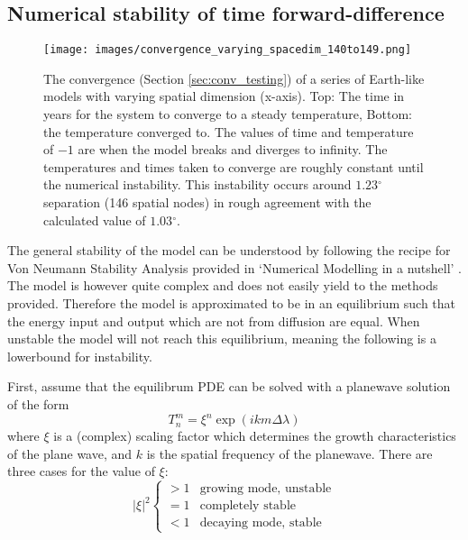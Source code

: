 \documentclass[12pt, onecolumn]{revtex4-2}    %
\newcommand{\degrees}{\ensuremath{^{\circ}}}
\begin{document}
\clearpage

\appendix


\subsection{Numerical stability of time forward-difference} \label{sec:numerical_stability}

\begin{figure}[ht]
    \texttt{[image: images/convergence\_varying\_spacedim\_140to149.png]}
    \caption{The convergence (Section \ref{sec:conv_testing}) of a series of Earth-like models with varying spatial dimension (x-axis). Top: The time in years for the system to converge to a steady temperature, Bottom: the temperature converged to.
        The values of time and temperature of $-1$ are when the model breaks and diverges to infinity.
        The temperatures and times taken to converge are roughly constant until the numerical instability.
        This instability occurs around $1.23\degrees$ separation (146 spatial nodes) in rough agreement with the calculated value of $1.03\degrees$.}
    \label{fig:conv_spacedim}
\end{figure}

The general stability of the model can be understood by following the recipe for Von Neumann Stability Analysis provided in `Numerical Modelling in a nutshell' \cite{NumericalModelling}.
The model is however quite complex and does not easily yield to the methods provided.
Therefore the model is approximated to be in an equilibrium such that the energy input and output which are not from diffusion are equal.
When unstable the model will not reach this equilibrium, meaning the following is a lowerbound for instability.

First, assume that the equilibrum PDE can be solved with a planewave solution of the form
\begin{equation} \label{eq:trial_plane_wave}
    T^m_n = \xi^n \exp{(i k m \Delta\lambda)}
\end{equation}
where $\xi$ is a (complex) scaling factor which determines the growth characteristics of the plane wave, and $k$ is the spatial frequency of the planewave.
There are three cases for the value of $\xi$:
\begin{equation}\label{eq:stability_cases}
    |\xi|^2
    \begin{cases}
        > 1 & \text{growing mode, unstable} \\
        = 1 & \text{completely stable}      \\
        < 1 & \text{decaying mode, stable}
    \end{cases}
\end{equation}
\end{document}
